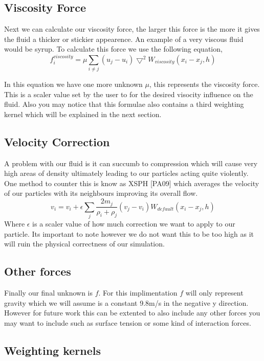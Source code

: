 \subsection*{Viscosity Force }

Next we can calculate our viscosity force, the larger this force is the more it gives the fluid a thicker or stickier appearence. An example of a very viscous fluid would be syrup. To calculate this force we use the following equation, \[ f_i^{viscosity} = \mu\sum\limits_{i\neq j}(u_j-u_i)\bigtriangledown^2 W_{viscosity}(x_i-x_j,h) \]\par
In this equation we have one more unknown $\mu$, this represents the viscosity force. This is a scaler value set by the user to for the desired visocity influence on the fluid. Also you may notice that this formulae also contains a third weighting kernel which will be explained in the next section.

\subsection*{Velocity Correction }

A problem with our fluid is it can succumb to compression which will cause very high areas of density ultimately leading to our particles acting quite violently. One method to counter this is know as X\-S\-P\-H \mbox{[}P\-A09\mbox{]} which averages the velocity of our particles with its neighbours improving its overall flow. \[ v_i = v_i + \epsilon\sum\limits_j\frac{2m_j}{\rho_i+\rho_j}(v_j-v_i)W_{default}(x_i-x_j,h) \] Where $\epsilon$ is a scaler value of how much correction we want to apply to our particle. Its important to note however we do not want this to be too high as it will ruin the physical correctness of our simulation.

\subsection*{Other forces }

Finally our final unknown is $f$. For this implimentation $f$ will only represent gravity which we will assume is a constant 9.\-8m/s in the negative y direction. However for future work this can be extented to also include any other forces you may want to include such as surface tension or some kind of interaction forces.

\subsection*{Weighting kernels }


